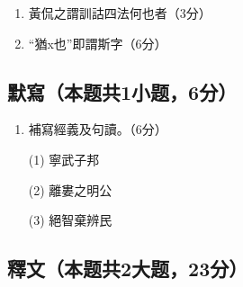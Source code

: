 \documentclass[12pt,a4paper]{article}
\begin{document}
\begin{enumerate}[leftmargin=*, label=\textbf{\arabic*.}, start=15]
    \item 黃侃之謂訓詁四法何也者（3分）
   
    \item “猶x也”即謂斯字（6分）
    
    \vspace{10em}
\end{enumerate}
\subsection{默寫（本题共1小题，6分）}

\begin{enumerate}[leftmargin=*, label=\textbf{\arabic*.}, start=17]
    \item 補寫經義及句讀。（6分）
    
    (1) 寧武子邦
    
    (2) 離婁之明公
    
    (3) 絕智棄辨民
\end{enumerate}

\subsection{釋文（本题共2大题，23分）}
\end{document}
